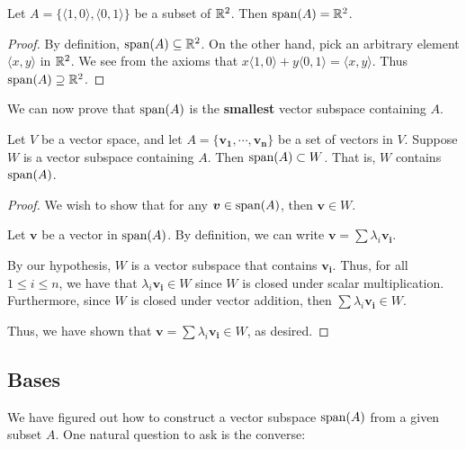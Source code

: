     
    
    \begin{example}
    Let $A = \{\langle 1,0 \rangle, \langle 0,1\rangle \}$ be a subset of $\mathbb{R}^2$.  Then $\textnormal{span}(A) = \mathbb{R}^2$.
    
    \begin{proof}
    By definition, $\textnormal{span}(A) \subseteq \mathbb{R}^2$.  On the other hand, pick an arbitrary element $\langle x, y \rangle$ in $\mathbb{R}^2$. We see from the axioms that $x\langle 1,0 \rangle + y\langle 0,1 \rangle = \langle x, y \rangle$.  Thus $\textnormal{span}(A) \supseteq \mathbb{R}^2$.
    \end{proof}
    \end{example}
    
    
    We can now prove that $\textnormal{span}(A)$ is the \textbf{smallest} vector subspace containing $A$.  
    
    \begin{theorem}
    Let $V$ be a vector space, and let $A = \{\bm{v_1}, \cdots, \bm{v_n}\}$ be a set of vectors in $V$.  Suppose $W$ is a vector subspace containing $A$.  Then $\textnormal{span}(A) \subset W$.  That is,  $W$ contains $\textnormal{span}(A)$.
    \end{theorem}
    
    \begin{proof}
    We wish to show that for any $\bm{v} \in \textnormal{span}(A)$, then $\bm{v} \in W$.

    Let $\bm{v}$ be a vector in $\textnormal{span}(A)$.  By definition, we can write $\bm{v} = \sum \lambda_i \bm{v_i}$.

    By our hypothesis, $W$ is a vector subspace that contains $\bm{v_i}$.  Thus, for all $1 \leq i \leq n$, we have that $\lambda_i\bm{v_i} \in W$  since $W$ is closed under scalar multiplication.  Furthermore, since $W$ is closed under vector addition, then $\sum \lambda_i \bm{v_i} \in W$.  

    Thus, we have shown that $\bm{v} = \sum \lambda_i \bm{v_i} \in W$, as desired.
    
    \end{proof}
    
    \subsection{Bases}
    
    We have figured out how to construct a vector subspace $\textnormal{span}(A)$ from a given subset $A$.  One natural question to ask is the converse:
    
